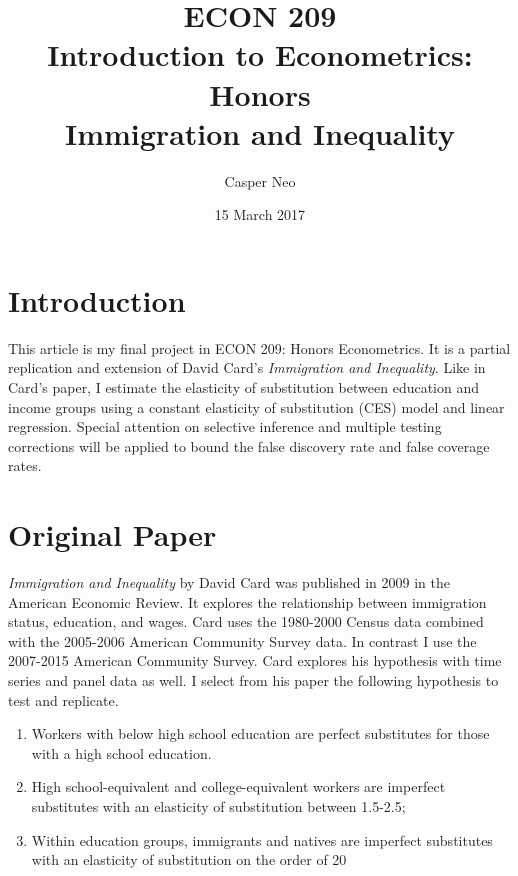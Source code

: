 \documentclass[11pt]{article}
\theoremstyle{definition}
\theoremstyle{remark}
\newcommand{\name}{Casper Neo}
\newcommand{\classname}{Introduction to Econometrics: Honors}
\newcommand{\classnumber}{ECON 209}
\newcommand{\due}{15 March 2017}
\newcommand{\num}{}
\newcommand{\type}{Immigration and Inequality}
\begin{document}
\title{
	\vspace{-00mm}
    \classnumber\\
	\classname\\
    \type \space \num\\
}
\author{
	\name
}
\date{
	\due\\
}

\maketitle

\section{Introduction}

This article is my final project in ECON 209: Honors Econometrics.
It is a partial replication and extension of David Card's
\textit{Immigration and Inequality}. Like in Card's paper, I estimate the
elasticity of substitution between education and income groups using a constant
elasticity of substitution (CES) model and linear regression.
Special attention on selective inference and multiple testing
corrections will be applied to bound the false discovery rate and false coverage
rates.


\renewcommand{\baselinestretch}{0.75}\normalsize
\tableofcontents
\renewcommand{\baselinestretch}{1.0}\normalsize

\section{Original Paper}

\textit{Immigration and Inequality} by David Card was published in 2009 in the
American Economic Review. It explores the relationship between immigration
status, education, and wages. Card uses the 1980-2000 Census data combined with
the 2005-2006 American Community Survey data. In contrast I use the 2007-2015
American Community Survey. Card explores his hypothesis with time series and
panel data as well. I select from his paper the following hypothesis to
test and replicate.

\begin{enumerate}
    \item Workers with below high school education are perfect substitutes
    for those with a high school education.

    \item High school-equivalent and college-equivalent workers are imperfect
    substitutes with an elasticity of substitution between 1.5-2.5;

    \item Within education groups, immigrants and natives are imperfect
    substitutes with an elasticity of substitution on the order of 20
\end{enumerate}
\end{document}
